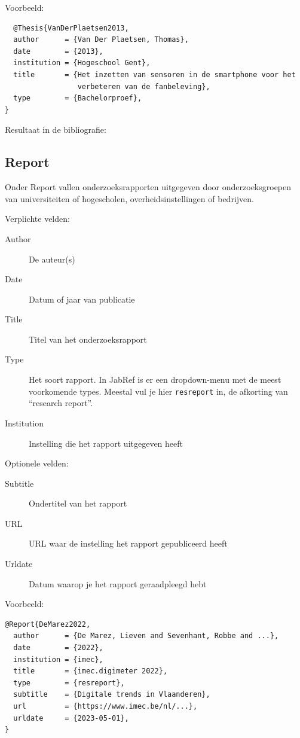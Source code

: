 Voorbeeld:
\begin{verbatim}
  @Thesis{VanDerPlaetsen2013,
  author      = {Van Der Plaetsen, Thomas},
  date        = {2013},
  institution = {Hogeschool Gent},
  title       = {Het inzetten van sensoren in de smartphone voor het
                 verbeteren van de fanbeleving},
  type        = {Bachelorproef},
}
\end{verbatim}

Resultaat in de bibliografie:

\subsection{Report}%
\label{ssec:report}

Onder Report vallen onderzoeksrapporten uitgegeven door onderzoeksgroepen van universiteiten of hogescholen, overheidsinstellingen of bedrijven.

Verplichte velden:

\begin{description}
  \item[Author] De auteur(s)
  \item[Date] Datum of jaar van publicatie
  \item[Title] Titel van het onderzoeksrapport
  \item[Type] Het soort rapport. In JabRef is er een dropdown-menu met de meest voorkomende types. Meestal vul je hier \texttt{resreport} in, de afkorting van ``research report''.
  \item[Institution] Instelling die het rapport uitgegeven heeft
\end{description}

Optionele velden:

\begin{description}
  \item[Subtitle] Ondertitel van het rapport
  \item[URL] URL waar de instelling het rapport gepubliceerd heeft
  \item[Urldate] Datum waarop je het rapport geraadpleegd hebt
\end{description}

Voorbeeld:
\begin{verbatim}
@Report{DeMarez2022,
  author      = {De Marez, Lieven and Sevenhant, Robbe and ...},
  date        = {2022},
  institution = {imec},
  title       = {imec.digimeter 2022},
  type        = {resreport},
  subtitle    = {Digitale trends in Vlaanderen},
  url         = {https://www.imec.be/nl/...},
  urldate     = {2023-05-01},
}
\end{verbatim}

